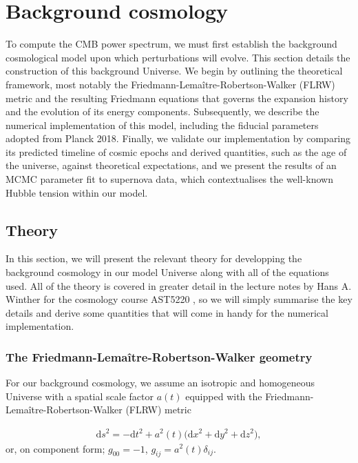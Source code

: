 \documentclass[twocolumn]{aa}
\renewcommand{\d}{\text{d}}
\begin{document}
\section{Background cosmology}
To compute the CMB power spectrum, we must first establish the background cosmological model upon which perturbations will evolve. This section details the construction of this background Universe. We begin by outlining the theoretical framework, most notably the Friedmann-Lemaître-Robertson-Walker (FLRW) metric and the resulting Friedmann equations that governs the expansion history and the evolution of its energy components. Subsequently, we describe the numerical implementation of this model, including the fiducial parameters adopted from Planck 2018. Finally, we validate our implementation by comparing its predicted timeline of cosmic epochs and derived quantities, such as the age of the universe, against theoretical expectations, and we present the results of an MCMC parameter fit to supernova data, which contextualises the well-known Hubble tension within our model.


\subsection{Theory}

In this section, we will present the relevant theory for developping the background cosmology in our model Universe along with all of the equations used. All of the theory is covered in greater detail in the lecture notes by Hans A. Winther for the cosmology course AST5220 \citep{winther_lectures, winther_milestone1}, so we will simply summarise the key details and derive some quantities that will come in handy for the numerical implementation.

\subsubsection{The Friedmann-Lemaître-Robertson-Walker geometry}

For our background cosmology, we assume an isotropic and homogeneous Universe with a spatial scale factor $a(t)$ equipped with the Friedmann-Lemaître-Robertson-Walker (FLRW) metric

\begin{align}
      \d s^2 = -\d t^2 + a^2(t)\Big(\d x^2+\d y^2+\d z^2\Big),\label{eq:FLRW metric}
\end{align}
or, on component form; $g_{00}=-1$, $g_{ij} = a^2(t)\delta_{ij}$.
\end{document}
